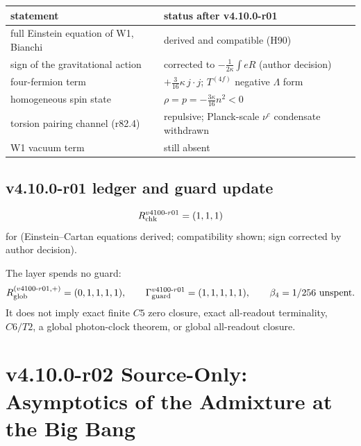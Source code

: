 \begin{center}
\small
\begin{tabular}{@{}>{\raggedright\arraybackslash}p{}>{\raggedright\arraybackslash}p{}@{}}
\toprule
statement & status after v4.10.0-r01\\
\midrule
full Einstein equation of W1, Bianchi & derived and compatible (H90)\\
sign of the gravitational action & corrected to \(-\tfrac1{2\kappa}\int eR\) (author decision)\\
four-fermion term & \(+\tfrac3{16}\kappa\,j\cdot j\); \(T^{(4f)}\) negative \(\Lambda\) form\\
homogeneous spin state & \(\rho=p=-\tfrac{3\kappa}{16}n^2<0\)\\
torsion pairing channel (r82.4) & repulsive; Planck-scale \(\nu^c\) condensate withdrawn\\
W1 vacuum term & still absent\\
\bottomrule
\end{tabular}
\end{center}

\subsection*{v4.10.0-r01 ledger and guard update}
\label{subsec:v4100-r01-ledger-guard}

\[
R_{\rm chk}^{v4100\text{-}r01}=(1,1,1)
\]
for (Einstein--Cartan equations derived; compatibility shown; sign corrected by author decision).

The layer spends no guard:
\[
R_{\rm glob}^{(v4100\text{-}r01,+)}=(0,1,1,1,1),
\qquad
\Gamma_{\rm guard}^{v4100\text{-}r01}=(1,1,1,1,1),
\qquad
\beta_4=1/256\ \text{unspent}.
\]
It does not imply exact finite \(C5\) zero closure, exact all-readout terminality,
\(C6/T2\), a global photon-clock theorem, or global all-readout closure.

\clearpage
\section*{v4.10.0-r02 Source-Only: Asymptotics of the Admixture at the Big Bang}
\label{sec:v4100-r02-admixture-asymptotics}

